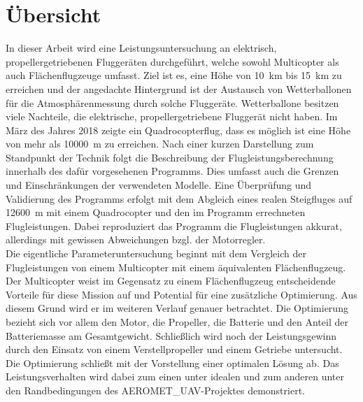 \chapter*{Übersicht}
In dieser Arbeit wird eine Leistungsuntersuchung an elektrisch, propellergetriebenen Fluggeräten durchgeführt, welche sowohl Multicopter als auch Flächenflugzeuge umfasst. Ziel ist es, eine Höhe von \SI{10}{km} bis \SI{15}{km} zu erreichen und der angedachte Hintergrund ist der Austausch von Wetterballonen für die Atmosphärenmessung durch solche Fluggeräte. Wetterballone besitzen viele Nachteile, die elektrische, propellergetriebene Fluggerät nicht haben. Im März des Jahres 2018 zeigte ein Quadrocopterflug, dass es möglich ist eine Höhe von mehr als \SI{10000}{m} zu erreichen. 
Nach einer kurzen Darstellung zum Standpunkt der Technik folgt die Beschreibung der Flugleistungsberechnung innerhalb des dafür vorgesehenen Programms. Dies umfasst auch die Grenzen und Einschränkungen der verwendeten Modelle. Eine Überprüfung und Validierung des Programms erfolgt mit dem Abgleich eines realen Steigfluges auf \SI{12600}{m} mit einem Quadrocopter und den im Programm errechneten Flugleistungen. Dabei reproduziert das Programm die Flugleistungen akkurat, allerdings mit gewissen Abweichungen bzgl. der Motorregler. \\
Die eigentliche Parameteruntersuchung beginnt mit dem Vergleich der Flugleistungen von einem Multicopter mit einem äquivalenten Flächenflugzeug. Der Multicopter weist im Gegensatz zu einem Flächenflugzeug entscheidende Vorteile für diese Mission auf und Potential für eine zusätzliche Optimierung. Aus diesem Grund wird er im weiteren Verlauf genauer betrachtet. Die Optimierung bezieht sich vor allem den Motor, die Propeller, die Batterie und den Anteil der Batteriemasse am Gesamtgewicht. Schließlich wird noch der Leistungsgewinn durch den Einsatz von einem Verstellpropeller und einem Getriebe untersucht. 
Die Optimierung schließt mit der Vorstellung einer optimalen Lösung ab. Das Leistungsverhalten wird dabei zum einen unter idealen und zum anderen unter den Randbedingungen des AEROMET\_UAV-Projektes demonstriert. 


